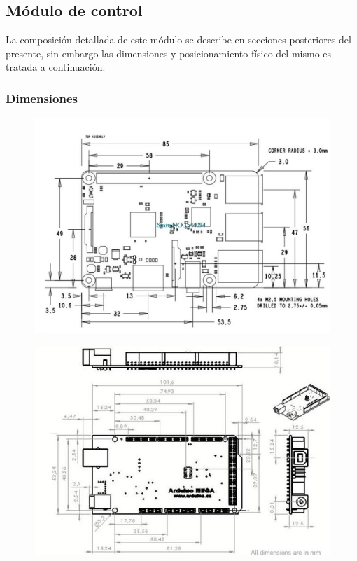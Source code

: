 \subsection{M\'odulo de control}

La composici\'on detallada de este m\'odulo se describe en secciones posteriores
del presente, sin embargo las dimensiones y posicionamiento f\'isico del mismo
es tratada a continuaci\'on.

\subsubsection{Dimensiones}

\begin{figure}[th]
\centering
\begin{minipage}{.5\textwidth}
  \centering
  \includegraphics[width=\linewidth]{Figures/rasp_dimensions.jpeg}
  \label{fig:dimensiones}
\end{minipage}%
\begin{minipage}{.5\textwidth}
  \centering
  \includegraphics[width=\linewidth]{Figures/ARDUINO-MEGA-2560.jpg}
\end{minipage}
\end{figure}

